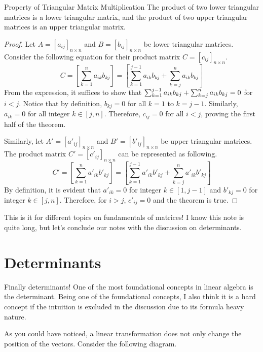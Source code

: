 \documentclass[../main.tex]{subfiles}
\begin{document}
\begin{theorem}{Property of Triangular Matrix Multiplication}
The product of two lower triangular matrices is a lower triangular
matrix, and the product of two upper triangular matrices is an upper
triangular matrix.
\end{theorem}
\begin{proof}
Let $A = [a_{ij}]_{n \times n}$ and $B = [b_{ij}]_{n \times n}$ be
lower triangular matrices. Consider the following equation for their
product matrix $C = [c_{ij}]_{n \times n}$.
\[
C
= \left[ \sum_{k = 1}^{n} a_{ik} b_{kj} \right]
= \left[
    \sum_{k = 1}^{j-1} a_{ik} b_{kj}
        + \sum_{k = j}^{n} a_{ik} b_{kj}
\right]
\]
From the expression, it suffices to show that $\sum_{k = 1}^{j-1}
a_{ik} b_{kj} + \sum_{k = j}^{n} a_{ik} b_{kj} \linebreak = 0$ for
$i < j$. Notice that by definition, $b_{kj} = 0$ for all $k = 1$ to
$k = j-1$. Similarly, $a_{ik} = 0$ for all integer $k \in [j, n]$.
Therefore, $c_{ij} = 0$ for all $i < j$, proving the first half of
the theorem.

Similarly, let $A' = [a'_{ij}]_{n \times n}$ and $B' =
[b'_{ij}]_{n \times n}$ be upper triangular matrices. The product
matrix $C'= [c'_{ij}]_{n \times n}$ can be represented as following.
\[
C'
= \left[ \sum_{k = 1}^{n} a'_{ik} b'_{kj} \right]
= \left[
    \sum_{k = 1}^{j-1} a'_{ik} b'_{kj}
        + \sum_{k = j}^{n} a'_{ik} b'_{kj}
\right]
\]
By definition, it is evident that $a'_{ik} = 0$ for integer $k
\in [1, j-1]$ and $b'_{kj} = 0$ for integer $k \in [j, n]$.
Therefore, for $i > j$, $c'_{ij} = 0$ and the theorem is true.
\end{proof}

This is it for different topics on fundamentals of matrices! I know
this note is quite long, but let's conclude our notes with the
discussion on determinants.

\section{Determinants}

Finally determinants! One of the most foundational concepts in linear
algebra is the determinant. Being one of the foundational concepts,
I also think it is a hard concept if the intuition is excluded in the
discussion due to its formula heavy nature.

As you could have noticed, a linear transformation does not only
change the position of the vectors. Consider the following diagram.
\end{document}
